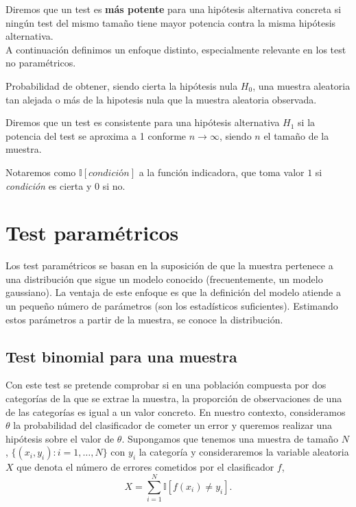	Diremos que un test es \textbf{más potente} para una 
hipótesis alternativa concreta si ningún test del mismo 
tamaño tiene mayor potencia contra la misma hipótesis 
alternativa.\\
	A continuación definimos un enfoque distinto,
especialmente relevante en los test no paramétricos. 
	
\begin{definicion}[$p$-valor]
	Probabilidad de obtener, siendo cierta la hipótesis nula 
$H_0$, una muestra aleatoria tan alejada o más de la 
hipotesis nula que la muestra aleatoria observada.
\end{definicion}

\begin{definicion}[Consistencia]
	Diremos que un test es consistente para una hipótesis 
alternativa $H_1$ si la potencia del test se aproxima a 1 
conforme $n \rightarrow \infty$, siendo $n$ el tamaño de la 
muestra.
\end{definicion}

	Notaremos como $\mathbb{I}[\textit{condición}]$ a la 
función indicadora, que toma valor $1$ si \textit{condición} es
cierta y 0 si no.
	
	
\section{Test paramétricos}

	Los test paramétricos se basan en la suposición de que la
muestra pertenece a una distribución que sigue un modelo 
conocido (frecuentemente, un modelo gaussiano). La ventaja de 
este enfoque es que la definición del modelo atiende a un 
pequeño número de parámetros (son los estadísticos 
suficientes). Estimando estos parámetros a partir de la 
muestra, se conoce la distribución. 
	
\subsection{Test binomial para una muestra}

	Con este test se pretende comprobar si en una población
compuesta por dos categorías de la que se extrae la muestra, 
la proporción de observaciones de una de las categorías es 
igual a un valor concreto. En nuestro contexto, consideramos 
$\theta$ la probabilidad del clasificador de cometer un error 
y queremos realizar una hipótesis sobre el valor de $\theta$. 
Supongamos que tenemos una muestra de tamaño $N$, 
$\{(x_i, y_i): i = 1, \dots,N \}$ con $y_i$ la categoría y
consideraremos la variable aleatoria $X$ que denota el número
de errores cometidos por el clasificador $f$,
	\[ 
		X = \sum\limits_{i=1}^N 
				\mathbb{I}[f(x_i) \neq y_i].
	\]
	
